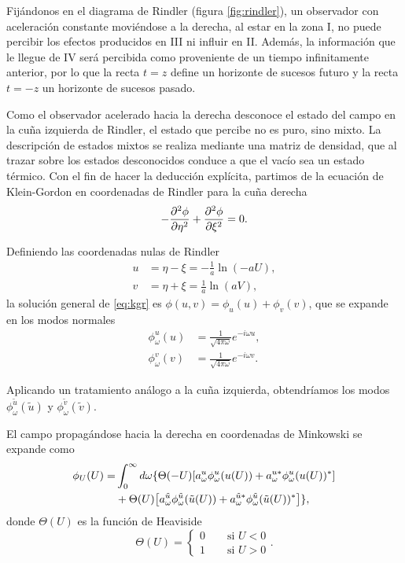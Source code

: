 Fijándonos en el diagrama de Rindler (figura \ref{fig:rindler}),
un observador con aceleración constante moviéndose a la derecha, al estar en la zona I,  no puede percibir los 
efectos producidos  en III ni influir en II. 
Además, la información que le llegue de IV será percibida como proveniente de un tiempo
infinitamente anterior, por lo que la recta $t=z$ define un horizonte de sucesos futuro y 
la recta $t=-z$ un horizonte de sucesos pasado.

Como el observador acelerado hacia la derecha desconoce el estado del campo en la 
cuña izquierda de Rindler, el estado que percibe no es puro, sino mixto.
La descripción de estados mixtos se realiza mediante una matriz de densidad, que al trazar
sobre los estados desconocidos conduce a que el vacío sea un estado térmico.
Con el fin de hacer la deducción explícita, partimos de la ecuación de Klein-Gordon en
coordenadas de Rindler para la cuña derecha
\begin{equation}
  -\pdv[2]{\phi}{\eta}+\pdv[2]{\phi}{\xi} = 0.
  \label{eq:kgr}
\end{equation}

Definiendo las coordenadas nulas de Rindler 
  \begin{align}
    u&=\eta-\xi=-\frac{1}{a}\ln(-aU)\label{eq:coorind} ,\\
    v&=\eta+\xi=\frac{1}{a}\ln(aV), 
  \end{align}
la solución general de \ref{eq:kgr} es $\phi(u,v)=\phi_u(u)+\phi_v(v)$, que se expande en los
modos normales
\begin{equation}
  \begin{aligned}
    \phi^u_\omega(u) &=\frac{1}{\sqrt{4\pi\omega}}e^{-i\omega u},\\
    \phi^v_\omega(v) &=\frac{1}{\sqrt{4\pi\omega}}e^{-i\omega v}.
  \end{aligned}
\end{equation}

Aplicando un tratamiento análogo a la cuña izquierda, obtendríamos los modos $\phi^{\tilde u}_\omega(\tilde u)$
y $\phi^{\tilde v}_\omega(\tilde v)$.

El campo propagándose hacia la derecha en coordenadas de Minkowski se expande como
\begin{equation}
  \begin{aligned}
    \phi_U(U)=&\int_0^\infty d\omega \{\Theta(-U)\qty[a^u_\omega \phi^u_\omega(u(U))+a_\omega^{u*}\phi_\omega^u(u(U))^*] \\
    &+\Theta(U)\qty[a^{\tilde u}_\omega \phi^{\tilde u}_\omega(\tilde u(U))+a_\omega^{\tilde u*}\phi_\omega^{\tilde u}(\tilde u(U))^*]\},
  \end{aligned}
\end{equation}
donde $\Theta(U)$ es la función de Heaviside 
\begin{equation}
   \Theta(U)=
  \begin{cases}
    0\qquad \text{si }U<0 \\
    1\qquad \text{si }U>0
  \end{cases}
  .
\end{equation}

